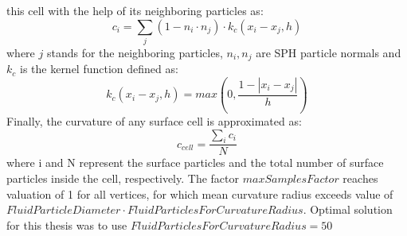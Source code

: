 this cell with the help of its neighboring particles as:
\begin{equation}
	c_i = \sum_j{(1 - n_i \cdot n_j)\cdot k_c(x_i-x_j, h)}
\end{equation}
where $j$ stands for the neighboring particles, $n_i, n_j$ are SPH particle normals and
$k_c$ is the kernel function defined as:
\begin{equation}
	k_c(x_i-x_j, h) = max\left(0, \dfrac{1 - |x_i - x_j|}{h}\right)
\end{equation}
Finally, the curvature of any surface cell is approximated as:
\begin{equation}
	c_{cell} = \dfrac{\sum_i{c_i}}{N}
\end{equation}
where i and N represent the surface particles and the total number of surface particles inside the cell, respectively. The factor $maxSamplesFactor$ reaches valuation of 1 for all vertices, for which mean curvature radius exceeds value of $FluidParticleDiameter \cdot FluidParticlesForCurvatureRadius$. Optimal solution for this thesis was to use $FluidParticlesForCurvatureRadius=50$

